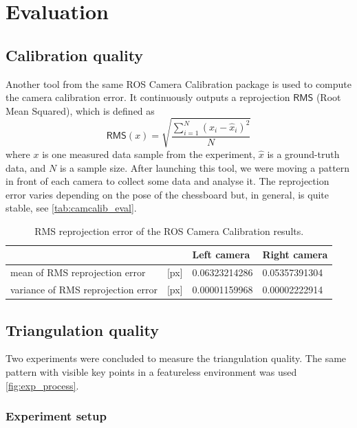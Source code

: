 \chapter{Evaluation}
\label{chapter:evaluation}

\section{Calibration quality}
Another tool from the same ROS Camera Calibration package is used to compute the camera calibration error.
It continuously outputs a reprojection $\mathsf{RMS}$ (Root Mean Squared), which is defined as
\begin{equation}
    \mathsf{RMS}(x) = \sqrt{\frac{\sum_{i=1}^{N}{(x_i - \hat{x}_i)^2}}{N}}
\end{equation}
where $x$ is one measured data sample from the experiment, $\hat{x}$ is a ground-truth data, and $N$ is a sample size.
After launching this tool, we were moving a pattern in front of each camera to collect some data and analyse it.
The reprojection error varies depending on the pose of the chessboard but, in general, is quite stable, see \autoref{tab:camcalib_eval}.

\begin{table}[ht]
    \begin{center}
      \begin{tabular}{ ll l l }
      \hline
      && Left camera & Right camera \\ \hline
      mean of RMS reprojection error & [px] & 0.06323214286 & 0.05357391304 \\
      variance of RMS reprojection error & [px] & 0.00001159968 & 0.00002222914 \\
      \end{tabular}
    \end{center}
    \caption{RMS reprojection error of the ROS Camera Calibration results.}
    \label{tab:camcalib_eval}
\end{table}

\section{Triangulation quality}
Two experiments were concluded to measure the triangulation quality.
The same pattern with visible key points in a featureless environment was used \autoref{fig:exp_process}.

\subsection{Experiment setup}
\label{sec:eval_setup}


